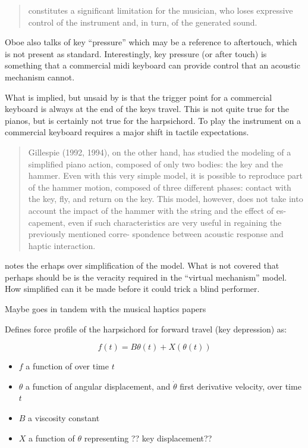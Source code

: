 \begin{quotation}
  constitutes a significant limitation for the musician, who loses expressive control of the instrument and, in turn, of the generated sound.
\end{quotation}

Oboe also talks of key ``pressure'' which may be a reference to aftertouch, which is not present as standard. Interestingly, key pressure (or after touch) is something that a commercial midi keyboard can provide control that an acoustic mechanism cannot.

What is implied, but unsaid by \textcite{oboe_mikey_2006} is that the trigger point for a commercial keyboard is always at the end of the keys travel. This is not quite true for the pianos, but is certainly not true for the harpsichord. To play the instrument on a commercial keyboard requires a major shift in tactile expectations.


\begin{quotation}
    Gillespie (1992, 1994), on the other hand, has studied the modeling of a simplified piano action, composed of only two bodies: the key and the hammer. Even with this very simple model, it is possible to reproduce part of the hammer motion, composed of three different phases: contact with the key, fly, and return on the key. This model, however, does not take into account the impact of the hammer with the string and the effect of es- capement, even if such characteristics are very useful in regaining the previously mentioned corre- spondence between acoustic response and haptic interaction.
\end{quotation}

\textcite{oboe_mikey_2006} notes the erhaps over simplification of the model. What is not covered that perhaps should be is the veracity required in the ``virtual mechanism'' model. How simplified can it be made before it could trick a blind performer.

Maybe goes in tandem with the musical haptics papers

Defines force profile of the harpsichord for forward travel (key depression) as:

\[ f(t) = Bθ(t) + X(θ(t))\]

\begin{itemize}
    \item \(f\) a function of over time \(t\)
    \item \(\theta\) a function of angular displacement, and \(\dot{\theta}\) first derivative velocity, over time \(t\)
    \item \(B\) a viscosity constant
    \item \(X\) a function of \(\theta\) representing ?? key displacement??
\end{itemize}

